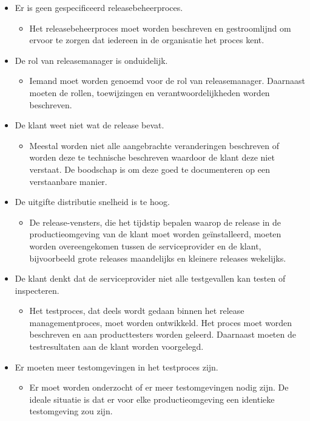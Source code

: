 \begin{itemize}
    \item Er is geen gespecificeerd releasebeheerproces.
    \begin{itemize}
        \item Het releasebeheerproces moet worden beschreven en gestroomlijnd om ervoor te zorgen dat iedereen in de organisatie het proces kent.
    \end{itemize}
    \item De rol van releasemanager is onduidelijk.
    \begin{itemize}
        \item Iemand moet worden genoemd voor de rol van releasemanager. Daarnaast moeten de rollen, toewijzingen en verantwoordelijkheden worden beschreven.
    \end{itemize}
    \item De klant weet niet wat de release bevat.
    \begin{itemize}
        \item Meestal worden niet alle aangebrachte veranderingen beschreven of worden deze te technische beschreven waardoor de klant deze niet verstaat. De boodschap is om deze goed te documenteren op een verstaanbare manier.
    \end{itemize}
     \item De uitgifte distributie snelheid is te hoog.
    \begin{itemize}
        \item De release-vensters, die het tijdstip bepalen waarop de release in de productieomgeving van de klant moet worden geïnstalleerd, moeten worden overeengekomen tussen de serviceprovider en de klant, bijvoorbeeld grote releases maandelijks en kleinere releases wekelijks.
    \end{itemize}
    \item De klant denkt dat de serviceprovider niet alle testgevallen kan testen of inspecteren.
    \begin{itemize}
        \item Het testproces, dat deels wordt gedaan binnen het release managementproces, moet worden ontwikkeld. Het proces moet worden beschreven en aan producttesters worden geleerd. Daarnaast moeten de testresultaten aan de klant worden voorgelegd.
    \end{itemize}
    \item Er moeten meer testomgevingen in het testproces zijn.
    \begin{itemize}
        \item Er moet worden onderzocht of er meer testomgevingen nodig zijn. De ideale situatie is dat er voor elke productieomgeving een identieke testomgeving zou zijn.

\end{itemize}
\end{itemize}
